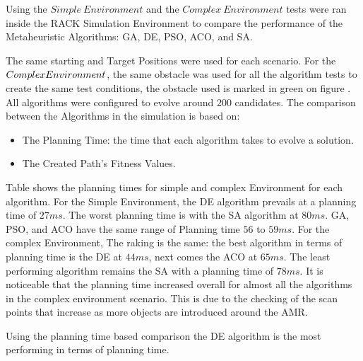 Using the \(Simple~Environment\) and the \(Complex~Environment\) tests were ran inside the 
RACK Simulation Environment to compare the performance of the Metaheuristic Algorithms: GA, DE, PSO,
ACO, and SA. 

The same starting and Target Positions were used for each scenario. For the \(Complex~\\Environment\),
the same obstacle was used for all the algorithm tests to create the same test conditions, the obstacle used is 
marked in green on figure . All algorithms were configured to evolve around 200 candidates.
The comparison between the Algorithms in the simulation is based on: 
\begin{itemize}
    \item The Planning Time: the time that each algorithm takes to evolve a solution.
    \item The Created Path's Fitness Values.
\end{itemize}

Table  shows the planning times for simple and complex Environment 
for each algorithm. 
For the Simple Environment, the DE algorithm prevails at a planning time of \(27ms\).
The worst planning time is with the SA algorithm at \(80ms\). 
GA, PSO, and ACO have the same range of Planning time \(56\) to \(59ms\).
For the complex Environment, The raking is the same: the best algorithm in terms of planning time 
is the DE at \(44ms\), next comes the ACO at \(65ms\). The least performing algorithm remains the SA 
with a planning time of \(78ms\). It is noticeable that the planning time increased overall
for almost all the algorithms in the complex environment scenario. 
This is due to the checking of the scan points that increase as more objects are introduced around the AMR.

Using the planning time based comparison the DE algorithm is the most performing in terms of planning time. 

